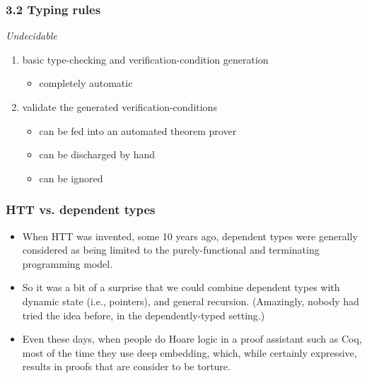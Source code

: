 \documentclass[xcolor=dvipsnames,9pt,hide notes,mathserif]{beamer}
\begin{document}
\begin{frame}
  \frametitle{3.2 Typing rules}
  \textit{Undecidable}
  \begin{enumerate}
  \item basic type-checking and verification-condition generation
    \begin{itemize}
    \item completely automatic
    \end{itemize}
  \item validate the generated verification-conditions
    \begin{itemize}
    \item can be fed into an automated theorem prover
    \item can be discharged by hand
    \item can be ignored
    \end{itemize}
  \end{enumerate}
\end{frame}







\begin{frame}
  \frametitle{HTT vs. dependent types}
  \begin{itemize}
  \item When HTT was invented, some 10 years ago, dependent types were generally considered as
    being limited to the purely-functional and terminating programming
    model. 
    \item So it was a bit of a surprise that we could combine
      dependent types with dynamic state (i.e., pointers), and general
      recursion. (Amazingly, nobody had tried the idea before, in the
      dependently-typed setting.)
    \item  Even these days, when people do Hoare logic in a proof assistant such as Coq, most of the time they use deep embedding, which, while certainly expressive, results in proofs that are consider to be torture. 
  \end{itemize}
\end{frame}
\end{document}
